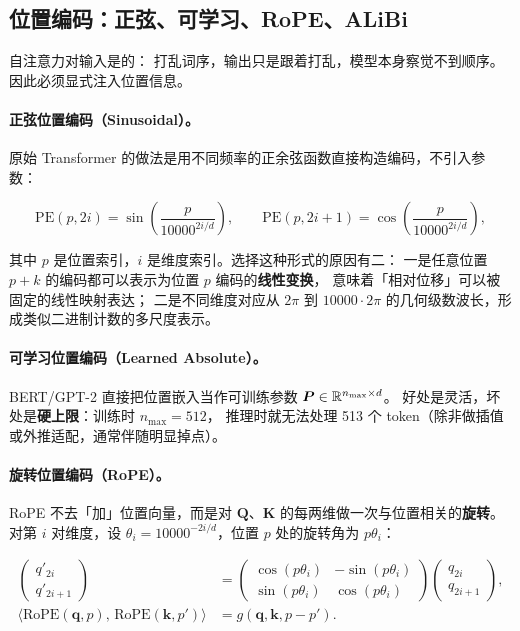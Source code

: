 \subsection{位置编码：正弦、可学习、RoPE、ALiBi}

自注意力对输入是的：
打乱词序，输出只是跟着打乱，模型本身察觉不到顺序。
因此必须显式注入位置信息。

\paragraph{正弦位置编码（Sinusoidal）。}
原始 Transformer 的做法是用不同频率的正余弦函数直接构造编码，不引入参数：

\begin{equation}
\text{PE}(p, 2i) = \sin\!\left( \frac{p}{10000^{2i/d}} \right), \qquad
\text{PE}(p, 2i+1) = \cos\!\left( \frac{p}{10000^{2i/d}} \right),
\label{eq:sinusoidal}
\end{equation}

其中 $p$ 是位置索引，$i$ 是维度索引。选择这种形式的原因有二：
一是任意位置 $p + k$ 的编码都可以表示为位置 $p$ 编码的\textbf{线性变换}，
意味着「相对位移」可以被固定的线性映射表达；
二是不同维度对应从 $2\pi$ 到 $10000 \cdot 2\pi$ 的几何级数波长，形成类似二进制计数的多尺度表示。

\paragraph{可学习位置编码（Learned Absolute）。}
BERT/GPT-2 直接把位置嵌入当作可训练参数 $\bm{P} \in \mathbb{R}^{n_{\max} \times d}$。
好处是灵活，坏处是\textbf{硬上限}：训练时 $n_{\max} = 512$，
推理时就无法处理 513 个 token（除非做插值或外推适配，通常伴随明显掉点）。

\paragraph{旋转位置编码（RoPE）。}
RoPE 不去「加」位置向量，而是对 $\bm{Q}$、$\bm{K}$ 的每两维做一次与位置相关的\textbf{旋转}。
对第 $i$ 对维度，设 $\theta_i = 10000^{-2i/d}$，位置 $p$ 处的旋转角为 $p\theta_i$：

\begin{equation}
\begin{aligned}
\begin{pmatrix} q'_{2i} \\ q'_{2i+1} \end{pmatrix}
&= \begin{pmatrix} \cos(p\theta_i) & -\sin(p\theta_i) \\ \sin(p\theta_i) & \cos(p\theta_i) \end{pmatrix}
\begin{pmatrix} q_{2i} \\ q_{2i+1} \end{pmatrix}, \\
\langle \text{RoPE}(\bm{q}, p),\, \text{RoPE}(\bm{k}, p') \rangle
&= g(\bm{q}, \bm{k}, p - p') .
\end{aligned}
\label{eq:rope}
\end{equation}

